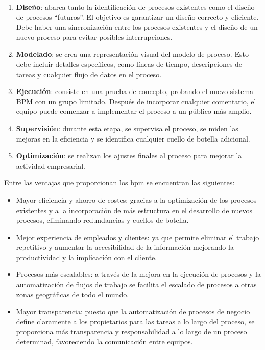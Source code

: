 \begin{enumerate}
\item \textbf{Diseño}: abarca tanto la identificación de procesos existentes como el diseño de procesos ``futuros''. El objetivo es garantizar un diseño correcto y eficiente. Debe haber una sincronización entre los procesos existentes y el diseño de un nuevo proceso para evitar posibles interrupciones.
\item \textbf{Modelado}: se crea una representación visual del modelo de proceso. Esto debe incluir detalles específicos, como líneas de tiempo, descripciones de tareas y cualquier flujo de datos en el proceso. 
\item \textbf{Ejecución}: consiste en una prueba de concepto, probando el nuevo sistema BPM con un grupo limitado. Después de incorporar cualquier comentario, el equipo puede comenzar a implementar el proceso a un público más amplio.
\item \textbf{Supervisión}:  durante esta etapa, se supervisa el proceso, se miden las mejoras en la eficiencia y se identifica cualquier cuello de botella adicional.
\item \textbf{Optimización}: se realizan los ajustes finales al proceso para mejorar la actividad empresarial.
\end{enumerate}

Entre las ventajas que proporcionan los \acrshort{bpm} se encuentran las siguientes:
\begin{itemize}
\item Mayor eficiencia y ahorro de costes: gracias a la optimización de los procesos existentes y a la incorporación de más estructura en el desarrollo de nuevos procesos, eliminando redundancias y cuellos de botella.
\item Mejor experiencia de empleados y clientes: ya que permite eliminar el trabajo repetitivo y aumentar la accesibilidad de la información mejorando la productividad y la implicación con el cliente.
\item Procesos más escalables: a través de la mejora en la ejecución de procesos y la automatización de flujos de trabajo se facilita el escalado de procesos a otras zonas geográficas de todo el mundo.
\item Mayor transparencia: puesto que la automatización de procesos de negocio define claramente a los propietarios para las tareas a lo largo del proceso, se proporciona más transparencia y responsabilidad a lo largo de un proceso determinad, favoreciendo la comunicación entre equipos.
\end{itemize}




